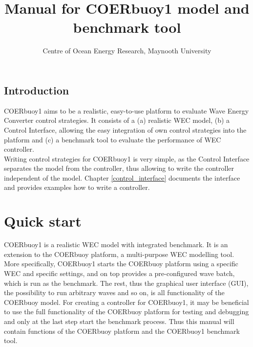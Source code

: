 \documentclass[oneside,10pt,a4paper]{book}
\title{Manual for COERbuoy1 model and benchmark tool}
\author{Centre of Ocean Energy Research, Maynooth University}
\begin{document}
\maketitle
\section*{Introduction}
COERbuoy1 aims to be a realistic, easy-to-use platform to evaluate Wave Energy Converter control strategies. It consists of a (a) realistic WEC model, (b) a Control Interface, allowing the easy integration of own control strategies into the platform and (c) a benchmark tool to evaluate the performance of WEC controller.\\
Writing control strategies for COERbuoy1 is very simple, as the Control Interface separates the model from the controller, thus allowing to write the controller independent of the model. Chapter \ref{control_interface} documents the interface and provides examples how to write a controller.%
\tableofcontents
\newpage
\chapter{Quick start}
COERbuoy1 is a realistic WEC model with integrated benchmark. It is an extension to the COERbuoy platform, a multi-purpose WEC modelling tool. More specifically, COERbuoy1 starts the COERbuoy platform using a specific WEC and specific settings, and on top provides a pre-configured wave batch, which is run as the benchmark. The rest, thus the graphical user interface (GUI), the possibility to run arbitrary waves and so on, is all functionality of the COERbuoy model. For creating a controller for COERbuoy1, it may be beneficial to use the full functionality of the COERbuoy platform for testing and debugging and only at the last step start the benchmark process. Thus this manual will contain functions of the COERbuoy platform and the COERbuoy1 benchmark tool.
\end{document}
